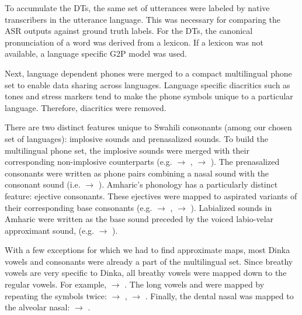 \documentclass[a4paper]{article}
\begin{document}
To accumulate the DTs, the same set of utterances were labeled by native transcribers in the utterance language. This was necessary for comparing the ASR outputs against ground truth labels. For the DTs, the canonical pronunciation of a word was derived from a lexicon. If a lexicon was not available, a language specific G2P model was used.

Next, language dependent phones were merged to a compact multilingual phone set to enable data sharing across languages. Language specific diacritics such as tones and stress markers tend to make the phone symbols unique to a particular language. Therefore,  diacritics were removed. 

There are two distinct features unique to Swahili consonants (among our chosen set of languages): implosive sounds and prenasalized sounds. To build the multilingual phone set, the implosive sounds were merged with their corresponding non-implosive counterparts (e.g.  $\rightarrow$ ,  $\rightarrow$ ). The prenasalized consonants were written as phone pairs combining a nasal sound with the consonant sound (i.e.  $\rightarrow$  ). Amharic's phonology has a particularly distinct feature: ejective consonants. These ejectives were mapped to aspirated variants of their corresponding base consonants (e.g.  $\rightarrow$ ,  $\rightarrow$ ). Labialized sounds in Amharic were written as the base sound preceded by the voiced labio-velar approximant sound,  (e.g.  $\rightarrow$  ).

With a few exceptions for which we had to find approximate maps, most Dinka vowels and consonants were already a part of the multilingual set. Since breathy vowels are very specific to Dinka, all breathy vowels were mapped down to the regular vowels. For example,  $\rightarrow$ . The long vowels  and  were mapped by repeating the symbols twice:  $\rightarrow$ ,  $\rightarrow$ . Finally, the dental nasal was mapped to the alveolar nasal: \textipa{\|[n} $\rightarrow$ . 

\end{document}
